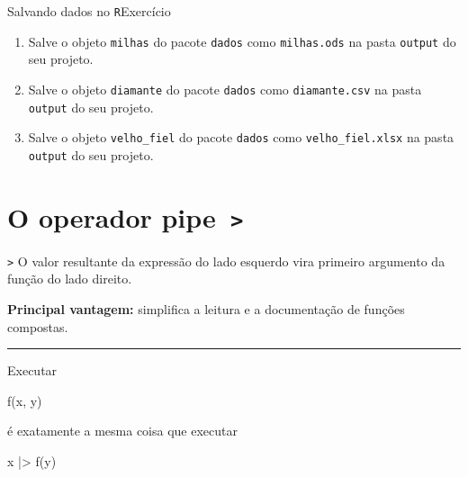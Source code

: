 \documentclass[
  10pt,
  ignorenonframetext,
]{beamer}
\newenvironment{Shaded}{\begin{snugshade}}{\end{snugshade}}
\newcommand{\FunctionTok}[1]{\textcolor[rgb]{0.28,0.35,0.67}{#1}}
\newcommand{\NormalTok}[1]{\textcolor[rgb]{0.00,0.23,0.31}{#1}}
\newcommand{\SpecialCharTok}[1]{\textcolor[rgb]{0.37,0.37,0.37}{#1}}
\providecommand{\tightlist}{%
  \setlength{\itemsep}{0pt}\setlength{\parskip}{0pt}}\usepackage{longtable,booktabs,array}
\newcommand*{\regrafina}{\rule{\textwidth}{0.5pt}}
\begin{document}
\begin{frame}[fragile]{Salvando dados no \texttt{R}\newline Exercício}
\protect\hypertarget{salvando-dados-no-rexercuxedcio}{}
\begin{enumerate}
\tightlist
\item
  Salve o objeto \texttt{milhas} do pacote \texttt{dados} como
  \texttt{milhas.ods} na pasta \texttt{output} do seu projeto.
\item
  Salve o objeto \texttt{diamante} do pacote \texttt{dados} como
  \texttt{diamante.csv} na pasta \texttt{output} do seu projeto.
\item
  Salve o objeto \texttt{velho\_fiel} do pacote \texttt{dados} como
  \texttt{velho\_fiel.xlsx} na pasta \texttt{output} do seu projeto.
\end{enumerate}
\end{frame}

\hypertarget{o-operador-pipe}{%
\section{\texorpdfstring{O operador
pipe\newline~\texttt{\textbar{}\textgreater{}}}{O operador pipe~\textbar\textgreater{}}}\label{o-operador-pipe}}

\begin{frame}[fragile]{\texttt{\textbar{}\textgreater{}}}
\protect\hypertarget{section}{}
O valor resultante da expressão do lado esquerdo vira primeiro argumento
da função do lado direito.

\textbf{Principal vantagem:} simplifica a leitura e a documentação de
funções compostas.

\regrafina

Executar

\begin{Shaded}
\begin{Highlighting}[]
\FunctionTok{f}\NormalTok{(x, y)}
\end{Highlighting}
\end{Shaded}

é exatamente a mesma coisa que executar

\begin{Shaded}
\begin{Highlighting}[]
\NormalTok{x }\SpecialCharTok{|\textgreater{}} \FunctionTok{f}\NormalTok{(y)}
\end{Highlighting}
\end{Shaded}
\end{frame}
\end{document}
